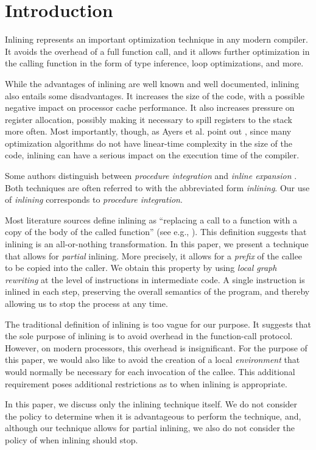 \section{Introduction}

Inlining represents an important optimization technique in any modern
compiler.  It avoids the overhead of a full function call, and it
allows further optimization in the calling function in the form of
type inference, loop optimizations, and more.

While the advantages of inlining are well known and well documented,
inlining also entails some disadvantages.  It increases the size of
the code, with a possible negative impact on processor cache
performance.  It also increases pressure on register allocation,
possibly making it necessary to spill registers to the stack more
often.  Most importantly, though, as Ayers et al. point out
\cite{Ayers:1997:AI:258915.258928, Ayers:1997:AI:258916.258928}, since
many optimization algorithms do not have linear-time complexity in the
size of the code, inlining can have a serious impact on the execution
time of the compiler.

Some authors distinguish between \emph{procedure integration} and
\emph{inline expansion} \cite{Muchnick:1998:ACD:286076}.  Both
techniques are often referred to with the abbreviated form
\emph{inlining}.  Our use of \emph{inlining} corresponds to
\emph{procedure integration}.

Most literature sources define inlining as ``replacing a call to a
function with a copy of the body of the called function'' (see e.g.,
\cite{Chang:1989:IFE:74818.74840,Chang:1989:IFE:73141.74840,
  Scheifler:1977:AIS:359810.359830}). This definition suggests that
inlining is an all-or-nothing transformation.  In this paper, we
present a technique that allows for \emph{partial} inlining.  More
precisely, it allows for a \emph{prefix} of the callee to be copied
into the caller.  We obtain this property by using \emph{local graph
  rewriting} at the level of instructions in intermediate code.  A
single instruction is inlined in each step, preserving the overall
semantics of the program, and thereby allowing us to stop the process
at any time.

The traditional definition of inlining is too vague for our
purpose.  It suggests that the sole purpose of inlining is to avoid
overhead in the function-call protocol.  However, on modern
processors, this overhead is insignificant.  For the purpose of this
paper, we would also like to avoid the creation of a local
\emph{environment} that would normally be necessary for each
invocation of the callee.  This additional requirement poses
additional restrictions as to when inlining is appropriate.

In this paper, we discuss only the inlining technique itself.  We do
not consider the policy to determine when it is advantageous to
perform the technique, and, although our technique allows for partial
inlining, we also do not consider the policy of when inlining should
stop.

